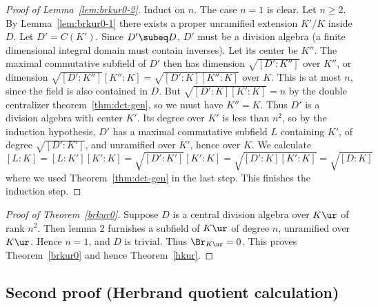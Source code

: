 \begin{proof}[Proof of Lemma~\ref{lem:brkur0-2}]
Induct on $n$. The case $n=1$ is clear. Let $n\ge 2$. By Lemma~\ref{lem:brkur0-1} there exists a proper unramified extension $K'/K$ inside $D$. Let $D'=C(K')$. Since $D'\subeq D$, $D'$ must be a division algebra (a finite dimensional integral domain must contain inverses). Let its center be $K''$. The maximal commutative subfield of $D'$ then has dimension $\sqrt{[D':K'']}$ over $K''$, or dimension $\sqrt{[D':K'']}[K'':K]=\sqrt{[D':K][K'':K]}$ over $K$. This is at most $n$, since the field is also contained in $D$. But $\sqrt{[D':K][K':K]}=n$ by the double centralizer theorem~\ref{thm:dct-gen}, so we must have $K''=K$. Thus $D'$ is a division algebra with center $K'$.
Its degree over $K'$ is less than $n^2$, so %
by the induction hypothesis, $D'$ has a maximal commutative subfield $L$ containing $K'$, of degree $\sqrt{[D':K']}$, and unramified over $K'$, hence over $K$. We calculate
\[
[L:K]=[L:K'][K':K]=\sqrt{[D':K']}[K':K]=\sqrt{[D':K][K':K]}=\sqrt{[D:K]}
\]
where we used Theorem~\ref{thm:dct-gen} in the last step. This finishes the induction step.
\end{proof}
\begin{proof}[Proof of Theorem~\ref{brkur0}]
Suppose $D$ is a central division algebra over $K\ur$ of rank $n^2$. Then lemma 2 furnishes a subfield of $K\ur$ of degree $n$, unramified over $K\ur$. Hence $n=1$, and $D$ is trivial. Thus $\Br_{K\ur}=0$. This proves Theorem~\ref{brkur0} and hence Theorem~\ref{hkur}.
\end{proof}
\subsection{Second proof (Herbrand quotient calculation)}
